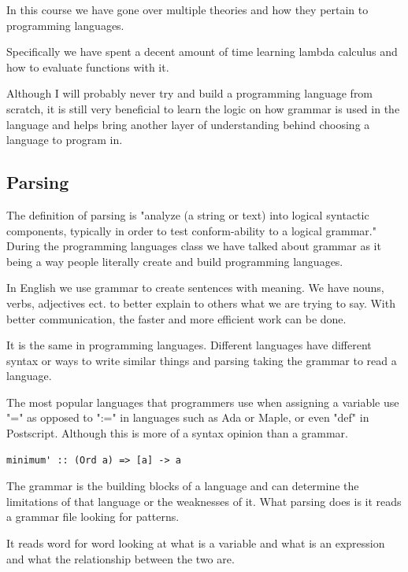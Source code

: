 \documentclass{article}
\begin{document}
\medskip\noindent
In this course we have gone over multiple theories and how they pertain to programming languages. 

\medskip\noindent
Specifically we have spent a decent amount of time learning lambda calculus and how to evaluate functions with it. 

\medskip\noindent
Although I will probably never try and build a programming language from scratch, it is still very beneficial to learn the logic on how grammar is used in the language and helps bring another layer of understanding behind choosing a language to program in.

\subsection{Parsing}

\medskip\noindent
The definition of parsing is "analyze (a string or text) into logical syntactic components, typically in order to test conform-ability to a logical grammar."\cite{PAR} During the programming languages class we have talked about grammar as it being a way people literally create and build programming languages. 

\medskip\noindent
In English we use grammar to create sentences with meaning. We have nouns, verbs, adjectives ect. to better explain to others what we are trying to say. With better communication, the faster and more efficient work can be done. 

\medskip\noindent
It is the same in programming languages. Different languages have different syntax or ways to write similar things and parsing taking the grammar to read a language. 

\medskip\noindent
The most popular languages that programmers use when assigning a variable use "=" as opposed to ":=" in languages such as Ada or Maple, or even "def" in Postscript. Although this is more of a syntax opinion than a grammar. 

\medskip\noindent
\begin{lstlisting}
minimum' :: (Ord a) => [a] -> a  
\end{lstlisting}

\medskip\noindent
The grammar is the building blocks of a language and can determine the limitations of that language or the weaknesses of it. What parsing does is it reads a grammar file looking for patterns. 

\medskip\noindent
It reads word for word looking at what is a variable and what is an expression and what the relationship between the two are. 
\end{document}
